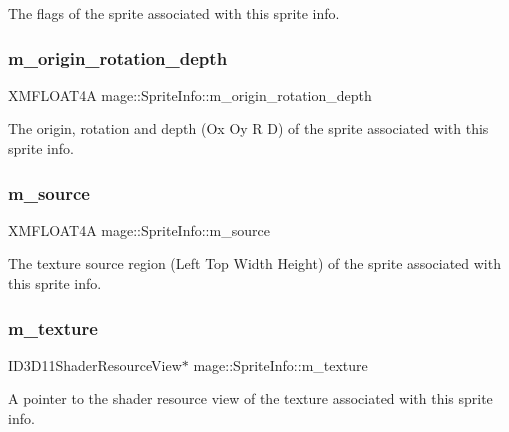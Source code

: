 The flags of the sprite associated with this sprite info. \hypertarget{structmage_1_1_sprite_info_ae8026876747e7b5924d6940551895ccd}{}\label{structmage_1_1_sprite_info_ae8026876747e7b5924d6940551895ccd} 
\subsubsection{\texorpdfstring{m\+\_\+origin\+\_\+rotation\+\_\+depth}{m\_origin\_rotation\_depth}}
{\footnotesize\ttfamily X\+M\+F\+L\+O\+A\+T4A mage\+::\+Sprite\+Info\+::m\+\_\+origin\+\_\+rotation\+\_\+depth}

The origin, rotation and depth (Ox Oy R D) of the sprite associated with this sprite info. \hypertarget{structmage_1_1_sprite_info_a15e373b0b7edf90e512a4a0f665c810f}{}\label{structmage_1_1_sprite_info_a15e373b0b7edf90e512a4a0f665c810f} 
\subsubsection{\texorpdfstring{m\+\_\+source}{m\_source}}
{\footnotesize\ttfamily X\+M\+F\+L\+O\+A\+T4A mage\+::\+Sprite\+Info\+::m\+\_\+source}

The texture source region (Left Top Width Height) of the sprite associated with this sprite info. \hypertarget{structmage_1_1_sprite_info_aea9963f991406a050bc5759fb05cfd5e}{}\label{structmage_1_1_sprite_info_aea9963f991406a050bc5759fb05cfd5e} 
\subsubsection{\texorpdfstring{m\+\_\+texture}{m\_texture}}
{\footnotesize\ttfamily I\+D3\+D11\+Shader\+Resource\+View$\ast$ mage\+::\+Sprite\+Info\+::m\+\_\+texture}

A pointer to the shader resource view of the texture associated with this sprite info. \hypertarget{structmage_1_1_sprite_info_afe8aa37311d56f8411cfe878607f6f68}{}\label{structmage_1_1_sprite_info_afe8aa37311d56f8411cfe878607f6f68} 
